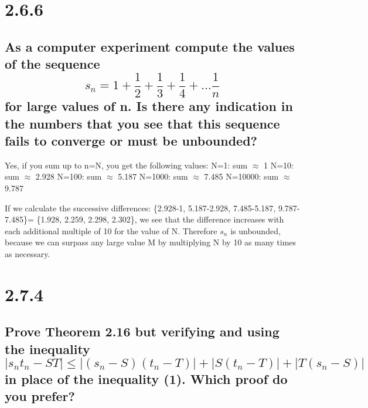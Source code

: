 \documentclass[11pt]{article}
\begin{document}
	
	\section*{2.6.6}
	\subsection*{As a computer experiment compute the values of the sequence
		$$s_n = 1 + \frac{1}{2} + \frac{1}{3} + \frac{1}{4} + \ldots \frac{1}{n}$$ for large values of n. Is there any indication in the numbers that you see that this sequence fails to converge or must be unbounded?}
	
	Yes, if you sum up to n=N, you get the following values: \newline  \newline
	N=1: sum $\approx$ 1 \newline
	N=10: sum $\approx$ 2.928 \newline
	N=100: sum $\approx$ 5.187 \newline
	N=1000: sum $\approx$ 7.485 \newline
	N=10000: sum $\approx$ 9.787 \newline
	
	If we calculate the successive differences: \{2.928-1, 5.187-2.928, 7.485-5.187, 9.787-7.485\}= \{1.928, 2.259, 2.298, 2.302\}, we see that the difference increases with each additional multiple of 10 for the value of N. Therefore $s_n$ is unbounded, because we can surpass any large value M by multiplying N by 10 as many times as necessary. 
	
	\section*{2.7.4}
	\subsection*{Prove Theorem 2.16 but verifying and using the inequality $$|s_nt_n - ST| \leq |(s_n − S)(t_n − T)| + |S(t_n − T)| + |T(s_n − S)|$$ in place of the inequality (1). Which proof do you prefer?}
	
	
\end{document}
